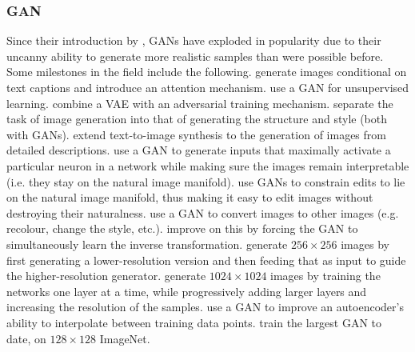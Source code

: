 \documentclass[10pt,a4paper]{article}
\begin{document}
\subsubsection{GAN}

Since their introduction by \citet{gan}, GANs have exploded in popularity due to their uncanny ability to generate more realistic samples than were possible before. Some milestones in the field include the following. \citet{imagefromcaption} generate images conditional on text captions and introduce an attention mechanism. \citet{unsupervisedgan} use a GAN for unsupervised learning. \citet{vaegan} combine a VAE with an adversarial training mechanism. \citet{structurestylegan} separate the task of image generation into that of generating the structure and style (both with GANs). \citet{texttoimagegan} extend text-to-image synthesis to the generation of images from detailed descriptions. \citet{preferredinputs} use a GAN to generate inputs that maximally activate a particular neuron in a network while making sure the images remain interpretable (i.e. they stay on the natural image manifold). \citet{manifoldmanipulation} use GANs to constrain edits to lie on the natural image manifold, thus making it easy to edit images without destroying their naturalness. \citet{imagetoimagegan} use a GAN to convert images to other images (e.g. recolour, change the style, etc.). \citet{cyclegan} improve on this by forcing the GAN to simultaneously learn the inverse transformation. \citet{stackgan} generate $256\times 256$ images by first generating a lower-resolution version and then feeding that as input to guide the higher-resolution generator. \citet{progressivegrowing} generate $1024\times 1024$ images by training the networks one layer at a time, while progressively adding larger layers and increasing the resolution of the samples. \citet{vaeganinterpolation} use a GAN to improve an autoencoder's ability to interpolate between training data points. \citet{largegan} train the largest GAN to date, on $128\times 128$ ImageNet.
\end{document}
